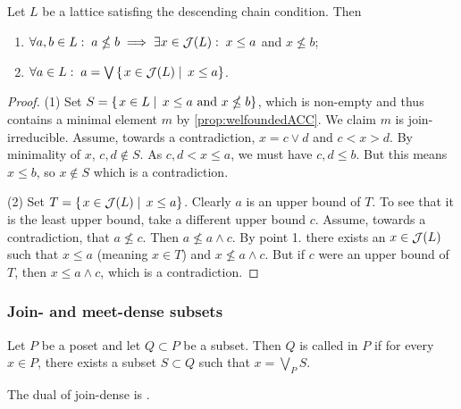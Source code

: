 \begin{proposition} \label{prop:joinIrreducibilityDescendingChainLattice}
Let $L$ be a lattice satisfing the descending chain condition. Then
\begin{enumerate}
\item $\forall a,b\in L:\; a\nleq b \implies \exists x\in \mathop{\mathcal{J}}(L): \; x\leq a$ and $x\nleq b$;
\item $\forall a\in L:\; a = \bigvee\left\{\left. x\in\mathop{\mathcal{J}}(L) \;\right|\; x\leq a \right\}$.
\end{enumerate}
\end{proposition}
\begin{proof}
(1) Set $S = \left\{\left. x\in L \;\right|\; \text{$x\leq a$ and $x\nleq b$} \right\}$, which is non-empty and thus contains a minimal element $m$ by \ref{prop:welfoundedACC}. We claim $m$ is join-irreducible. Assume, towards a contradiction, $x = c\vee d$ and $c < x > d$. By minimality of $x$, $c,d\notin S$. As $c,d< x \leq a$, we must have $c,d\leq b$. But this means $x\leq b$, so $x\notin S$ which is a contradiction.

(2) Set $T = \left\{\left. x\in\mathop{\mathcal{J}}(L) \;\right|\; x\leq a \right\}$. Clearly $a$ is an upper bound of $T$. To see that it is the least upper bound, take a different upper bound $c$. Assume, towards a contradiction, that $a\nleq c$. Then $a\nleq a\wedge c$. By point 1. there exists an $x\in\mathop{\mathcal{J}}(L)$ such that $x\leq a$ (meaning $x\in T$) and $x\nleq a\wedge c$. But if $c$ were an upper bound of $T$, then $x\leq a\wedge c$, which is a contradiction.
\end{proof}


\subsubsection{Join- and meet-dense subsets}
\begin{definition}
Let $P$ be a poset and let $Q\subset P$ be a subset. Then $Q$ is called  in $P$ if for every $x\in P$, there exists a subset $S\subset Q$ such that $x= \bigvee_P S$.

The dual of join-dense is .
\end{definition}

